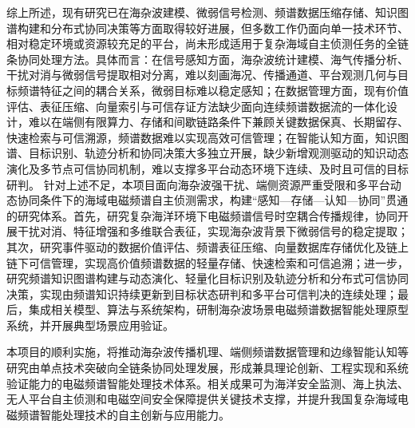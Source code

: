 综上所述，现有研究已在海杂波建模、微弱信号检测、频谱数据压缩存储、知识图谱构建和分布式协同决策等方面取得较好进展，但多数工作仍面向单一技术环节、相对稳定环境或资源较充足的平台，尚未形成适用于复杂海域自主侦测任务的全链条协同处理方法。具体而言：在信号感知方面，海杂波统计建模、海气传播分析、干扰对消与微弱信号提取相对分离，难以刻画海况、传播通道、平台观测几何与目标频谱特征之间的耦合关系，微弱目标难以稳定感知；在数据管理方面，现有价值评估、表征压缩、向量索引与可信存证方法缺少面向连续频谱数据流的一体化设计，难以在端侧有限算力、存储和间歇链路条件下兼顾关键数据保真、长期留存、快速检索与可信溯源，频谱数据难以实现高效可信管理；在智能认知方面，知识图谱、目标识别、轨迹分析和协同决策大多独立开展，缺少新增观测驱动的知识动态演化及多节点可信协同机制，难以支撑多平台动态环境下连续、及时且可信的目标研判。
针对上述不足，本项目面向海杂波强干扰、端侧资源严重受限和多平台动态协同条件下的海域电磁频谱自主侦测需求，构建“感知—存储—认知—协同”贯通的研究体系。首先，研究复杂海洋环境下电磁频谱信号时空耦合传播规律，协同开展干扰对消、特征增强和多维联合表征，实现海杂波背景下微弱信号的稳定提取；其次，研究事件驱动的数据价值评估、频谱表征压缩、向量数据库存储优化及链上链下可信管理，实现高价值频谱数据的轻量存储、快速检索和可信追溯；进一步，研究频谱知识图谱构建与动态演化、轻量化目标识别及轨迹分析和分布式可信协同决策，实现由频谱知识持续更新到目标状态研判和多平台可信判决的连续处理；最后，集成相关模型、算法与系统架构，研制海杂波场景电磁频谱数据智能处理原型系统，并开展典型场景应用验证。

本项目的顺利实施，将推动海杂波传播机理、端侧频谱数据管理和边缘智能认知等研究由单点技术突破向全链条协同处理发展，形成兼具理论创新、工程实现和系统验证能力的电磁频谱智能处理技术体系。相关成果可为海洋安全监测、海上执法、无人平台自主侦测和电磁空间安全保障提供关键技术支撑，并提升我国复杂海域电磁频谱智能处理技术的自主创新与应用能力。

%
%
%

\begingroup
\let\itshape\upshape

\fontsize{10pt}{10pt}\selectfont



\endgroup

\newpage
